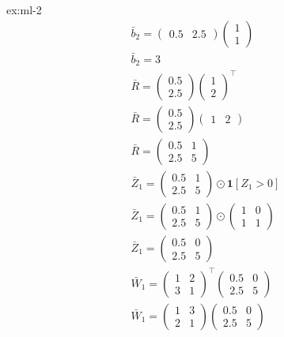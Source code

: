 \begin{solution}{ex:ml-2}
\[\begin{gathered}
      \bar b_2= \begin{pmatrix}0.5&2.5\end{pmatrix}\begin{pmatrix}1\\1\end{pmatrix}\\
      \bar b_2=3\\
      \bar R =  \begin{pmatrix}0.5\\2.5\end{pmatrix}\begin{pmatrix}1\\2\end{pmatrix}^{\!\top}\\
      \bar R = \begin{pmatrix}0.5\\2.5\end{pmatrix}\begin{pmatrix}1&2\end{pmatrix} \\
      \bar R = \begin{pmatrix}0.5&1\\2.5&5\end{pmatrix}\\
      \bar Z_1 =\begin{pmatrix}0.5&1\\2.5&5\end{pmatrix}\odot \mathbf{1}[Z_1>0]\\
      \bar Z_1 = \begin{pmatrix}0.5&1\\2.5&5\end{pmatrix}\odot\begin{pmatrix}1&0\\1&1\end{pmatrix}\\
      \bar Z_1 = \begin{pmatrix}0.5&0\\2.5&5\end{pmatrix}\\
      \bar W_1 = \begin{pmatrix}1&2\\3&1\end{pmatrix}^{\!\top} \begin{pmatrix}0.5&0\\2.5&5\end{pmatrix}\\
      \bar W_1 = \begin{pmatrix}1&3\\2&1\end{pmatrix} \begin{pmatrix}0.5&0\\2.5&5\end{pmatrix}\\

\end{gathered}\]
\end{solution}

